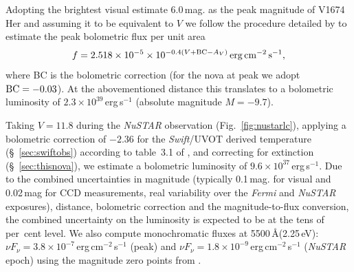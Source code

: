\documentclass[a4paper,fleqn,usenatbib]{mnras}
\newcommand{\nova}{V1674\,Her}
\newcommand{\opticalpeaklum}{$2.3 \times 10^{39}$\,erg\,s$^{-1}$}
\newcommand{\opticalnustareplum}{$9.6 \times 10^{37}$\,erg\,s$^{-1}$}
\begin{document}

Adopting the brightest visual estimate 6.0\,mag. as the peak magnitude of \nova{} and assuming it to be equivalent to $V$ 
we follow the procedure detailed by \cite{2022MNRAS.514.2239S} to estimate the peak bolometric 
flux per unit area \citep{2015arXiv151006262M} 
\begin{equation}
f = 2.518 \times 10^{-5} \times 10^{-0.4 (V+{\rm BC}-A_V) } \,{\rm erg}\,{\rm cm}^{-2}\,{\rm s}^{-1},
\label{eq:bolometricflux}
\end{equation}
where BC is the bolometric correction (for the nova at peak we adopt ${\rm BC} = -0.03$). 
At the abovementioned distance this translates to a bolometric luminosity of \opticalpeaklum{}
(absolute magnitude $M = -9.7$). 

Taking $V=11.8$ during the {\em NuSTAR} observation 
(Fig.~\ref{fig:nustarlc}), applying a bolometric correction 
of $-2.36$ for the {\em Swift}/UVOT derived temperature (\S~\ref{sec:swiftobs}) 
according to table~3.1 of \cite{2007iap..book.....B}, 
and correcting for extinction (\S~\ref{sec:thisnova}), 
we estimate a bolometric luminosity of \opticalnustareplum{}. 
%
Due to the combined uncertainties in magnitude 
(typically 0.1\,mag. for visual and 0.02\,mag for CCD measurements, 
real variability over the {\em Fermi} and {\em NuSTAR} exposures), 
distance, bolometric correction and the magnitude-to-flux conversion, 
the combined uncertainty on the luminosity is expected to be at 
the tens of per~cent level.
%
We also compute monochromatic fluxes at 5500\,\AA (2.25\,eV):  
$\nu F_\nu = 3.8 \times 10^{-7}$\,erg\,cm$^{-2}$\,s$^{-1}$ (peak) and
$\nu F_\nu = 1.8 \times 10^{-9}$\,erg\,cm$^{-2}$\,s$^{-1}$ ({\em NuSTAR} epoch)
using the magnitude zero points from \cite{1998A&A...333..231B}.
\end{document}
